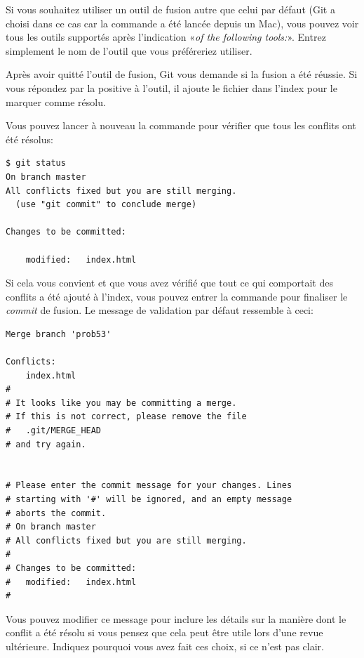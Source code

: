 Si vous souhaitez utiliser un outil de fusion autre que celui par défaut (Git a choisi  dans ce cas car la commande a été lancée depuis un Mac), vous pouvez voir tous les outils supportés après l'indication «\emph{of the following tools:}».
Entrez simplement le nom de l'outil que vous préféreriez utiliser.


Après avoir quitté l'outil de fusion, Git vous demande si la fusion a été réussie.
Si vous répondez par la positive à l'outil, il ajoute le fichier dans l'index pour le marquer comme résolu.

Vous pouvez lancer à nouveau la commande  pour vérifier que tous les conflits ont été résolus:
\begin{Schunk}
\begin{Verbatim}
$ git status
On branch master
All conflicts fixed but you are still merging.
  (use "git commit" to conclude merge)

Changes to be committed:

    modified:   index.html
\end{Verbatim}
\end{Schunk}

Si cela vous convient et que vous avez vérifié que tout ce qui comportait des conflits a été ajouté à l'index, vous pouvez entrer la commande  pour finaliser le \emph{commit} de fusion.
Le message de validation par défaut ressemble à ceci:
\begin{Schunk}
\begin{Verbatim}
Merge branch 'prob53'

Conflicts:
    index.html
#
# It looks like you may be committing a merge.
# If this is not correct, please remove the file
#	.git/MERGE_HEAD
# and try again.


# Please enter the commit message for your changes. Lines
# starting with '#' will be ignored, and an empty message
# aborts the commit.
# On branch master
# All conflicts fixed but you are still merging.
#
# Changes to be committed:
#	modified:   index.html
#
\end{Verbatim}
\end{Schunk}

Vous pouvez modifier ce message pour inclure les détails sur la manière dont le conflit a été résolu si vous pensez que cela peut être utile lors d'une revue ultérieure. Indiquez pourquoi vous avez fait ces choix, si ce n'est pas clair.

